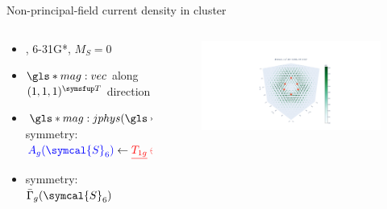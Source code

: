   \begin{frame}{Non-principal-field current density in  cluster}
    \begin{columns}
      \begin{column}{.40\textwidth}
        \begin{itemize}
          \setlength\itemsep{1.2em}
          \item<1-> , 6-31G*, $M_S = 0$
          \item<1-> $\gls*{mag:vec}$ along $(1, 1, 1)^{\T}$ direction
          \item<1-> $\gls*{mag:jphys}(\gls*{bas:spatialcoord})$ symmetry: $\textcolor{blue}{A_g(\symcal{S}_{6})} \leftarrow \textcolor{red}{\underline{T_{1g}} \oplus A_{2g}(\symcal{O}_{h})}$
          \item<1->  symmetry: $\bar{\Gamma}_g(\symcal{S}_{6})$
        \end{itemize}
      \end{column}

      \begin{column}{.55\textwidth}
        \begin{figure}
          \centering
          \includegraphics[trim=600 50 500 150, clip, width=\textwidth]{./cursym/data/h6/bxyz.png}
        \end{figure}
      \end{column}
    \end{columns}
  \end{frame}